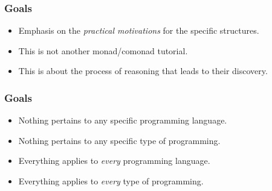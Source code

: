 \begin{frame}
\frametitle{Goals}
\begin{itemize}
\item<1-> Emphasis on the \emph{practical motivations} for the specific structures.
\item<2-> This is not another monad/comonad tutorial.
\item<3-> This is about the process of reasoning that leads to their discovery.
\end{itemize}
\end{frame}

\begin{frame}
\frametitle{Goals}
\begin{itemize}
\item<1-> Nothing pertains to any specific programming language.
\item<2-> Nothing pertains to any specific type of programming.
\item<3-> Everything applies to \emph{every} programming language.
\item<4-> Everything applies to \emph{every} type of programming.
\end{itemize}
\end{frame}
